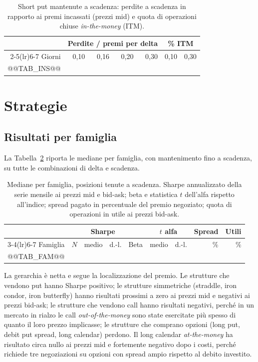 \documentclass[11pt,a4paper]{article}
\begin{document}
\begin{table}[ht]\centering\small
\caption{Short put mantenute a scadenza: perdite a scadenza in rapporto ai premi incassati (prezzi mid) e quota di operazioni chiuse \emph{in-the-money} (ITM).}\label{tab:ins}
\begin{tabular}{rrrrrrr}\toprule
 & \multicolumn{4}{c}{Perdite / premi per delta} & \multicolumn{2}{c}{\% ITM} \\ \cmidrule(lr){2-5}\cmidrule(lr){6-7}
Giorni & 0{,}10 & 0{,}16 & 0{,}20 & 0{,}30 & 0{,}10 & 0{,}30 \\ \midrule
@@TAB_INS@@
\bottomrule\end{tabular}\end{table}

\section{Strategie}\label{sec:strat}

\subsection{Risultati per famiglia}

La Tabella~\ref{tab:fam} riporta le mediane per famiglia, con mantenimento fino a scadenza, su tutte le combinazioni di delta e scadenza.

\begin{table}[ht]\centering\small
\caption{Mediane per famiglia, posizioni tenute a scadenza. Sharpe annualizzato della serie mensile ai prezzi mid e bid-ask; beta e statistica $t$ dell'alfa rispetto all'indice; spread pagato in percentuale del premio negoziato; quota di operazioni in utile ai prezzi bid-ask.}\label{tab:fam}
\begin{tabular}{lrrrrrrrr}\toprule
 & & \multicolumn{2}{c}{Sharpe} & & \multicolumn{2}{c}{$t$ alfa} & Spread & Utili \\ \cmidrule(lr){3-4}\cmidrule(lr){6-7}
Famiglia & $N$ & medio & d.-l. & Beta & medio & d.-l. & \% & \% \\ \midrule
@@TAB_FAM@@
\bottomrule\end{tabular}\end{table}

La gerarchia è netta e segue la localizzazione del premio. Le strutture che vendono put hanno Sharpe positivo; le strutture simmetriche (straddle, iron condor, iron butterfly) hanno risultati prossimi a zero ai prezzi mid e negativi ai prezzi bid-ask; le strutture che vendono call hanno risultati negativi, perché in un mercato in rialzo le call \emph{out-of-the-money} sono state esercitate più spesso di quanto il loro prezzo implicasse; le strutture che comprano opzioni (long put, debit put spread, long calendar) perdono. Il long calendar \emph{at-the-money} ha risultato circa nullo ai prezzi mid e fortemente negativo dopo i costi, perché richiede tre negoziazioni su opzioni con spread ampio rispetto al debito investito.
\end{document}
